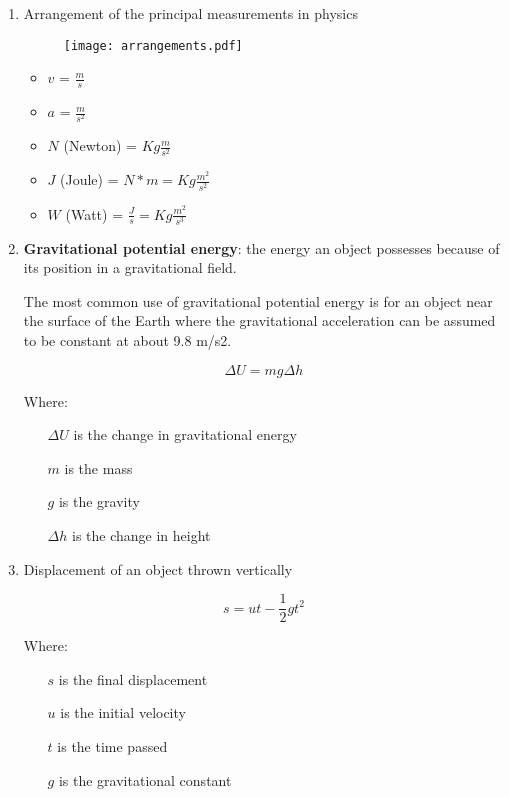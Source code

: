 
\begin{enumerate}

\item Arrangement of the principal measurements in physics

\begin{figure}[H]
\centering
\texttt{[image: arrangements.pdf]}
\end{figure}


\begin{itemize}
\item $v$ = $\frac{m}{s}$
\item $a$ = $\frac{m}{s^2}$
\item $N$ (Newton) = $Kg\frac{m}{s^2}$
\item $J$ (Joule) = $N*m=Kg\frac{m^2}{s^2}$
\item $W$ (Watt) = $\frac{J}{s}=Kg\frac{m^2}{s^3}$
\end{itemize}


\item \textbf{Gravitational potential energy}: the energy an object possesses because of its position in a gravitational field.

The most common use of gravitational potential energy is for an object near the surface of the Earth where the gravitational acceleration can be assumed to be constant at about 9.8 m/s2.

\begin{equation}
\Delta U=mg\Delta h
\end{equation}

Where:

\begin{enumerate}
\item[$\Delta U$] is the change in gravitational energy
\item[$m$] is the mass
\item[$g$] is the gravity
\item[$\Delta h$] is the change in height
\end{enumerate}

\item Displacement of an object thrown vertically

\begin{equation}
s=ut-\frac{1}{2}gt^2
\end{equation}

Where:
\begin{enumerate}
\item[$s$] is the final displacement
\item[$u$] is the initial velocity
\item[$t$] is the time passed
\item[$g$] is the gravitational constant
\end{enumerate}


\end{enumerate}
